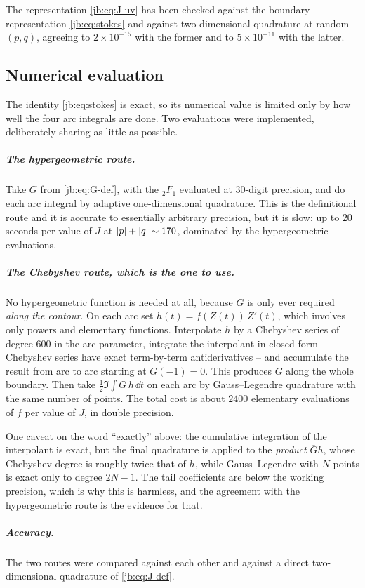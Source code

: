 The representation \eqref{jb:eq:J-uv} has been checked against the boundary representation
\eqref{jb:eq:stokes} and against two-dimensional quadrature at random $(p, q)$, agreeing to
$2 \times 10^{-15}$ with the former and to $5 \times 10^{-11}$ with the latter.


\subsection{Numerical evaluation}
\label{jb:sec:numerics}


The identity \eqref{jb:eq:stokes} is exact, so its numerical value is limited only by how well the four
arc integrals are done.
Two evaluations were implemented, deliberately sharing as little as possible.

\subparagraph{The hypergeometric route.}
Take $G$ from \eqref{jb:eq:G-def}, with the ${}_2F_1$ evaluated at $30$-digit precision, and do each
arc integral by adaptive one-dimensional quadrature.
This is the definitional route and it is accurate to essentially arbitrary precision, but it is
slow: up to $20$ seconds per value of $J$ at ${|p|} + {|q|} \sim 170$, dominated by the
hypergeometric evaluations.

\subparagraph{The Chebyshev route, which is the one to use.}
No hypergeometric function is needed at all, because $G$ is only ever required \emph{along the
contour}.
On each arc set $h(t) = f(Z(t)) \, Z'(t)$, which involves only powers and elementary functions.
Interpolate $h$ by a Chebyshev series of degree $600$ in the arc parameter, integrate the
interpolant in closed form -- Chebyshev series have exact term-by-term antiderivatives -- and
accumulate the result from arc to arc starting at $G(-1) = 0$.
This produces $G$ along the whole boundary.
Then take $\tfrac12 \Im \int \overline{G} \, h \, \dd t$ on each arc by Gauss--Legendre quadrature
with the same number of points.
The total cost is about $2400$ elementary evaluations of $f$ per value of $J$, in double precision.

One caveat on the word ``exactly'' above: the cumulative integration of the interpolant is exact,
but the final quadrature is applied to the \emph{product} $\overline{G} h$, whose Chebyshev degree
is roughly twice that of $h$, while Gauss--Legendre with $N$ points is exact only to degree
$2N - 1$.
The tail coefficients are below the working precision, which is why this is harmless, and the
agreement with the hypergeometric route is the evidence for that.

\subparagraph{Accuracy.}
The two routes were compared against each other and against a direct two-dimensional quadrature of
\eqref{jb:eq:J-def}.

